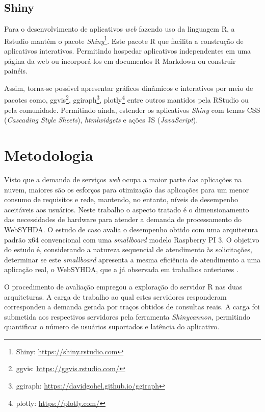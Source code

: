 \documentclass[12pt,english,brazil]{article}
\begin{document}
\subsection{Shiny} \label{sec:Shiny}

Para o desenvolvimento de aplicativos \emph{web} fazendo uso da linguagem R, a Rstudio mantém o pacote \emph{Shiny}\footnote{Shiny: \url{https://shiny.rstudio.com}}. Este pacote R que facilita a construção de aplicativos interativos. Permitindo hospedar aplicativos independentes em uma página da web ou incorporá-los em documentos R Markdown ou construir painéis. 

Assim, torna-se possivel apresentar gráficos dinâmicos e interativos por meio de pacotes como, ggvis\footnote{ggvis: \url{https://ggvis.rstudio.com/}}, ggiraph\footnote{ggiraph: \url{https://davidgohel.github.io/ggiraph}}, plotly\footnote{plotly: \url{https://plotly.com/}} entre outros mantidos pela RStudio ou pela comunidade. Permitindo ainda, estender os aplicativos \emph{Shiny} com temas CSS (\emph{Cascading Style Sheets}), \emph{htmlwidgets} e ações JS (\emph{JavaScript}).


\section{Metodologia} \label{sec:metodologia}

Visto que a demanda de serviços \textit{web} ocupa a maior parte das aplicações na nuvem, maiores são os esforços para otimização das aplicações para um menor consumo de requisitos e rede, mantendo, no entanto, níveis de desempenho aceitáveis aos usuários. Neste trabalho o aspecto tratado é o dimensionamento das necessidades de hardware para atender a demanda de processamento do WebSYHDA. O estudo de caso avalia o desempenho obtido com uma arquitetura padrão x64 convencional com uma \emph{smallboard} modelo Raspberry PI 3. O objetivo do estudo é, considerando a natureza sequencial de atendimento às solicitações, determinar se este \emph{smallboard} apresenta a mesma eficiência de atendimento a uma aplicação real, o WebSYHDA, que a já observada em trabalhos anteriores  \cite{silva2019estudo}.

O procedimento de avaliação empregou a exploração do servidor R nas duas arquiteturas. A carga de trabalho ao qual estes servidores responderam correspondeu a demanda gerada por traços obtidos de consultas reais. A carga foi submetida aos respectivos servidores pela  ferramenta \emph{Shinycannon}, permitindo quantificar o número de usuários suportados e latência do aplicativo.
\end{document}
